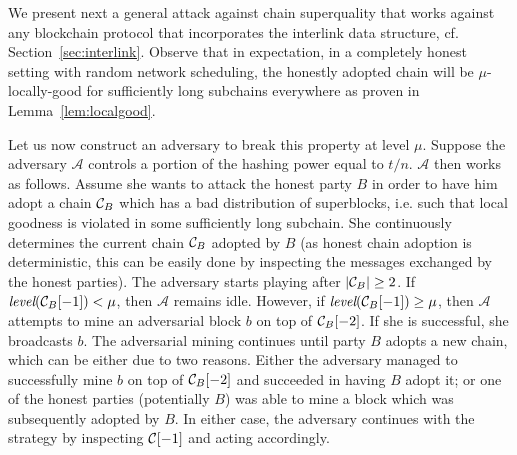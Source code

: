 We present next a general attack against chain superquality
that works against any blockchain protocol that incorporates
the interlink data structure, cf. Section~\ref{sec:interlink}. 
Observe that in expectation, in a
completely honest setting with random network scheduling, the honestly adopted
chain will be $\mu$-locally-good for sufficiently long subchains everywhere as
proven in Lemma~\ref{lem:localgood}.

Let us now construct an adversary to break this property at level $\mu$. Suppose
the adversary $\mathcal{A}$ controls a portion of the hashing power equal to
$t/n$. $\mathcal{A}$ then works as follows. Assume she wants to attack the
honest party $B$ in order to have him adopt a chain $\mathcal{C}_B$ which has a bad
distribution of superblocks, i.e. such that local goodness is violated in some
sufficiently long subchain. She continuously determines the current chain
$\mathcal{C}_B$ adopted by $B$ (as honest chain adoption is deterministic, this can
be easily done by inspecting the messages exchanged by the honest parties). The
adversary starts playing after $|\mathcal{C}_B| \geq 2$. If
$\textit{level}(\mathcal{C}_B[-1]) < \mu$, then $\mathcal{A}$ remains idle. However,
if $\textit{level}(\mathcal{C}_B[-1]) \geq \mu$, then $\mathcal{A}$ attempts to mine
an adversarial block $b$ on top of $\mathcal{C}_B[-2]$. If she is successful, she
broadcasts $b$. The adversarial mining continues until party $B$ adopts a new
chain, which can be either due to two reasons. Either the adversary managed to
successfully mine $b$ on top of $\mathcal{C}_B[-2]$ and succeeded in having $B$ adopt
it; or one of the honest parties (potentially $B$) was able to mine a block
which was subsequently adopted by $B$. In either case, the adversary continues
with the strategy by inspecting $\mathcal{C}[-1]$ and acting accordingly.


